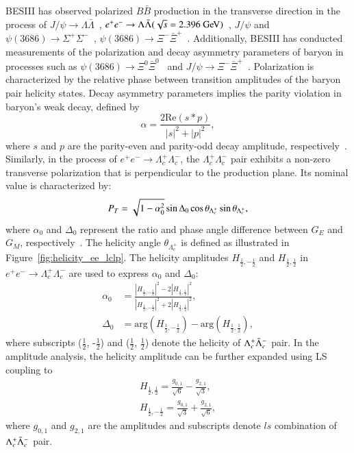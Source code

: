 BESIII has observed polarized $B\bar{B}$ production in the transverse direction in the process of $J/\psi \to \Lambda\bar{\Lambda}$~\cite{BESIII:2018cnd,BESIII:2022qax}, $e^+e^-\to\Lambda\bar{\Lambda}(\sqrt{s}=2.396\gev)$~\cite{BESIII:2019nep}, $J/\psi$ and $\psi(3686) \to \Sigma^+\Sigma^-$~\cite{BESIII:2020fqg}, $\psi(3686) \to \Xi^-\bar{\Xi}^+$~\cite{BESIII:2022lsz}. Additionally, BESIII has conducted measurements of the polarization and decay asymmetry parameters of baryon in processes such as $\psi(3686) \to \Xi^0\bar{\Xi}^0$~\cite{BESIII:2023lkg} and $J/\psi \to \Xi^-\bar{\Xi}^+$~\cite{BESIII:2021ypr}. Polarization is characterized by the relative phase between transition amplitudes of the baryon pair helicity states. Decay asymmetry parameters implies the parity violation in baryon's weak decay, defined by 
\begin{equation}
    \alpha = \frac{2\text{Re}(s * p)}{|s|^2 + |p|^2},
\end{equation}
where $s$ and $p$ are the parity-even and parity-odd decay amplitude, respectively~\cite{Lee:1957qs}.
Similarly, in the process of $e^+e^- \to \Lambda_c^+\Lambda_c^-$, the $\Lambda_c^+\Lambda_c^-$ pair exhibits a non-zero transverse polarization that is perpendicular to the production plane. Its nominal value is characterized by:
\begin{equation}
    P_T = \sqrt{1-\alpha_0^2}\sin\Delta_0\cos\theta_{\Lambda_{c}^{+}}\sin\theta_{\Lambda_{c}^{+}},
\end{equation}
where $\alpha_0$ and $\Delta_0$ represent the ratio and phase angle difference between $G_E$ and $G_M$, respectively~\cite{Chen:2019hqi}. The helicity angle $\theta_{\Lambda_c^+}$ is defined as illustrated in Figure~\ref{fig:helicity_ee_lclp}. The helicity amplitudes $H_{\frac{1}{2},-\frac{1}{2}}$ and $H_{\frac{1}{2},\frac{1}{2}}$ in $e^+e^- \to \Lambda_c^+\Lambda_c^-$ are used to express $\alpha_0$ and $\Delta_0$:
\begin{equation}
    \begin{split}
    \alpha_0 &= \frac{|H_{\frac{1}{2},-\frac{1}{2}}|^2 - 2|H_{\frac{1}{2},\frac{1}{2}}|^2}{|H_{\frac{1}{2},-\frac{1}{2}}|^2 + 2|H_{\frac{1}{2},\frac{1}{2}}|^2}, \\
    \Delta_0 &= \mathrm{arg}(H_{\frac{1}{2},-\frac{1}{2}}) - \mathrm{arg}(H_{\frac{1}{2},\frac{1}{2}}),
    \end{split}
\end{equation}
where subscripts ($\frac{1}{2}$, -$\frac{1}{2}$) and ($\frac{1}{2}$, $\frac{1}{2}$) denote the helicity of $\Lambda_{c}^{+}\bar{\Lambda}_{c}^{-}$ pair.
In the amplitude analysis, the helicity amplitude can be further expanded using LS coupling to
\begin{equation}
    \begin{split}
        H_{\frac{1}{2},\frac{1}{2}} = \frac{g_{0,1}}{\sqrt{6}} - \frac{g_{2,1}}{\sqrt{3}}, \\
        H_{\frac{1}{2},-\frac{1}{2}} = \frac{g_{0,1}}{\sqrt{3}} + \frac{g_{2,1}}{\sqrt{6}},
    \end{split}
\end{equation}
where $g_{0,1}$ and $g_{2,1}$ are the amplitudes and subscripts denote $ls$ combination of $\Lambda_{c}^{+}\bar{\Lambda}_{c}^{-}$ pair.

